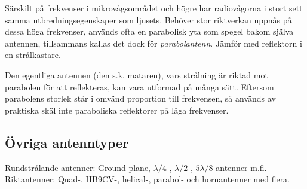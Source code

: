 Särskilt på frekvenser i mikrovågsområdet och högre har radiovågorna i
stort sett samma utbredningsegenskaper som ljusets.
Behöver stor riktverkan uppnås på dessa höga frekvenser, används ofta en
parabolisk yta som spegel bakom själva antennen, tillsammans kallas det dock
för \emph{parabolantenn}.
Jämför med reflektorn i en strålkastare.

Den egentliga antennen (den s.k. mataren), vars strålning är riktad
mot parabolen för att reflekteras, kan vara utformad på många sätt.
Eftersom parabolens storlek står i omvänd proportion till frekvensen, så
används av praktiska skäl inte paraboliska reflektorer på låga frekvenser.

\subsection{Övriga antenntyper}

Rundstrålande antenner: Ground plane, \(\lambda/4\)-, \(\lambda/2\)-,
\(5\lambda/8\)-antenner m.fl.
Riktantenner: Quad-, HB9CV-, helical-, parabol- och hornantenner med flera.
